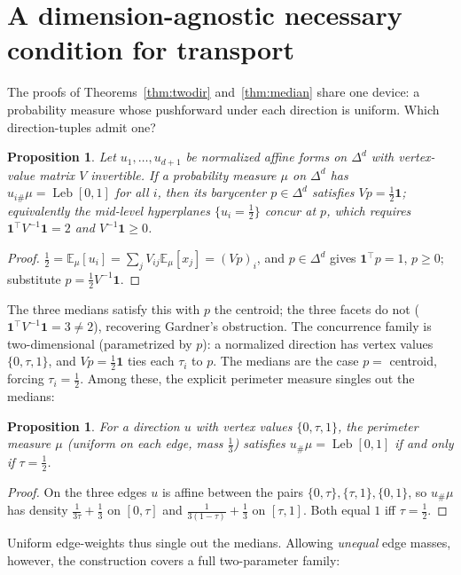 \documentclass[11pt,reqno]{amsart}
\theoremstyle{plain}
\newtheorem{proposition}[theorem]{Proposition}
\theoremstyle{definition}
\theoremstyle{remark}
\newcommand{\Leb}{\operatorname{Leb}}
\begin{document}
\section{A dimension-agnostic necessary condition for transport}\label{sec:concur}
The proofs of Theorems~\ref{thm:twodir} and~\ref{thm:median} share one device: a
probability measure whose pushforward under each direction is uniform. Which
direction-tuples admit one?
\begin{proposition}\label{prop:concur}
Let $u_1,\dots,u_{d+1}$ be normalized affine forms on $\Delta^d$ with vertex-value
matrix $V$ invertible. If a probability measure $\mu$ on $\Delta^d$ has
$u_{i\#}\mu=\Leb[0,1]$ for all $i$, then its barycenter $p\in\Delta^d$ satisfies
$Vp=\tfrac12\mathbf 1$; equivalently the mid-level hyperplanes $\{u_i=\tfrac12\}$
concur at $p$, which requires $\mathbf 1^\top V^{-1}\mathbf 1=2$ and
$V^{-1}\mathbf 1\ge0$.
\end{proposition}
\begin{proof}
$\tfrac12=\mathbb E_\mu[u_i]=\sum_j V_{ij}\mathbb E_\mu[x_j]=(Vp)_i$, and
$p\in\Delta^d$ gives $\mathbf 1^\top p=1$, $p\ge0$; substitute $p=\tfrac12V^{-1}\mathbf1$.
\end{proof}
The three medians satisfy this with $p$ the centroid; the three facets do not
($\mathbf 1^\top V^{-1}\mathbf 1=3\ne2$), recovering Gardner's obstruction. The
concurrence family is two-dimensional (parametrized by $p$): a normalized direction
has vertex values $\{0,\tau,1\}$, and $Vp=\tfrac12\mathbf1$ ties each $\tau_i$ to $p$.
The medians are the case $p=$ centroid, forcing $\tau_i=\tfrac12$. Among these, the
explicit perimeter measure singles out the medians:
\begin{proposition}\label{prop:tauhalf}
For a direction $u$ with vertex values $\{0,\tau,1\}$, the perimeter measure $\mu$
(uniform on each edge, mass $\tfrac13$) satisfies $u_\#\mu=\Leb[0,1]$ if and only if
$\tau=\tfrac12$.
\end{proposition}
\begin{proof}
On the three edges $u$ is affine between the pairs $\{0,\tau\},\{\tau,1\},\{0,1\}$,
so $u_\#\mu$ has density $\tfrac1{3\tau}+\tfrac13$ on $[0,\tau]$ and
$\tfrac1{3(1-\tau)}+\tfrac13$ on $[\tau,1]$. Both equal $1$ iff $\tau=\tfrac12$.
\end{proof}
Uniform edge-weights thus single out the medians. Allowing \emph{unequal} edge
masses, however, the construction covers a full two-parameter family:
\end{document}
